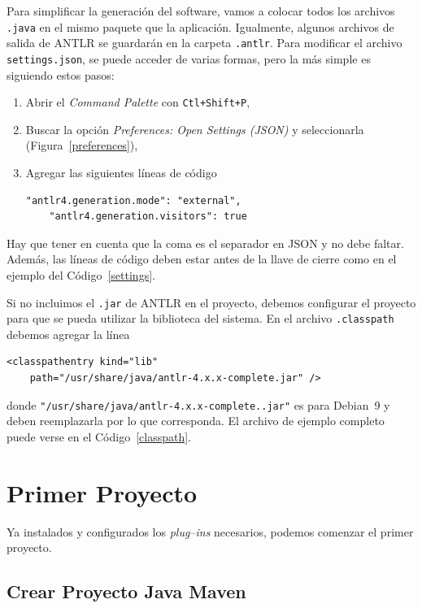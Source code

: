 \documentclass[a5paper,10pt]{article}
\begin{document}
Para simplificar la generación del software, vamos a colocar todos los archivos \verb|.java| en el mismo paquete que la aplicación.  Igualmente, algunos archivos de salida de ANTLR se guardarán en la carpeta \verb|.antlr|.  Para modificar el archivo \verb|settings.json|, se puede acceder de varias formas, pero la más simple es siguiendo estos pasos:
\begin{enumerate}
	\item Abrir el \emph{Command Palette} con \verb|Ctl+Shift+P|,
	\item Buscar la opción \emph{Preferences: Open Settings (JSON)} y seleccionarla (Figura~\ref{preferences}),
	\item Agregar las siguientes líneas de código
	\begin{lstlisting}[style=miJSON]
	"antlr4.generation.mode": "external",
	"antlr4.generation.visitors": true
	\end{lstlisting}
\end{enumerate}
Hay que tener en cuenta que la coma es el separador en JSON y no debe faltar.  Además, las líneas de código deben estar antes de la llave de cierre como en el ejemplo del Código~\ref{settings}.



Si no incluimos el \verb|.jar| de ANTLR en el proyecto, debemos configurar el proyecto para que se pueda utilizar la biblioteca del sistema.  En el archivo \verb|.classpath| debemos agregar la línea
\begin{lstlisting}[style=miXML]
<classpathentry kind="lib"
    path="/usr/share/java/antlr-4.x.x-complete.jar" />	
\end{lstlisting}
donde \verb|"/usr/share/java/antlr-4.x.x-complete..jar"| es para Debian~9 y deben reemplazarla por lo que corresponda.  El archivo de ejemplo completo puede verse en el Código~\ref{classpath}.




\section{Primer Proyecto}
\label{primerproyecto}

Ya instalados y configurados los \emph{plug--ins} necesarios, podemos comenzar el primer proyecto.

\subsection{Crear Proyecto Java Maven}
\label{proyecto_maven}
\end{document}
